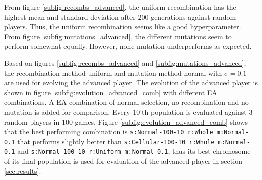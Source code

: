 \documentclass{llncs}
\begin{document}
From figure \ref{subfig:recombs_advanced}, the uniform recombination has the highest mean and standard deviation after $200$ generations against random players. Thus, the uniform recombination seems like a good hyperparameter. From figure \ref{subfig:mutations_advanced}, the different mutations seem to perform somewhat equally. However, none mutation underperforms as expected.

Based on figures \ref{subfig:recombs_advanced} and \ref{subfig:mutations_advanced}, the recombination method uniform and mutation method normal with $\sigma=0.1$ are used for evolving the advanced player. The evolution of the advanced player is shown in figure \ref{subfig:evolution_advanced_comb} with different EA combinations. A EA combination of normal selection, no recombination and no mutation is added for comparison. Every $10$'th population is evaluated against $3$ random players in $100$ games. Figure \ref{subfig:evolution_advanced_comb} shows that the best performing combination is \texttt{s:Normal-100-10 r:Whole m:Normal-0.1} that performs slightly better than \texttt{s:Cellular-100-10 r:Whole m:Normal-0.1} and \texttt{s:Normal-100-10 r:Uniform m:Normal-0.1}, thus its best chromosome of its final population is used for evaluation of the advanced player in section \ref{sec:results}.
\end{document}
